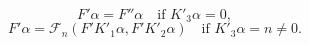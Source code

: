 $$F' \alpha = F'' \alpha \quad \text{if } K'_3 \alpha = 0,$$
$$F' \alpha = \mathcal{F}_n(F'K'_1 \alpha, F'K'_2 \alpha) \quad \text{if } K'_3 \alpha = n \neq 0.$$
